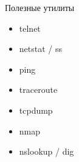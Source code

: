 \begin{frame}{Полезные утилиты}

	\begin{itemize}
		\item telnet
		\item netstat / ss
		\item ping
		\item traceroute
		\item tcpdump
		\item nmap
		\item nslookup / dig
	\end{itemize}

\end{frame}


